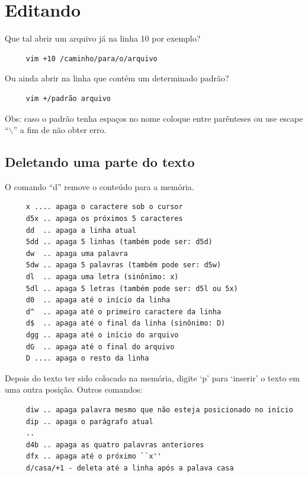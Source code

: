 \documentclass[10pt,a4paper,openany]{book}
\begin{document}
\chapter{Editando}
\label{Editando}

Que tal abrir um arquivo já na linha 10 por exemplo?

\begin{verbatim}
     vim +10 /caminho/para/o/arquivo
\end{verbatim}

Ou ainda abrir na linha que contém um determinado padrão?

\begin{verbatim}
     vim +/padrão arquivo
\end{verbatim}

Obs: caso o padrão tenha espaços no nome coloque entre parênteses ou
use escape ``$\backslash$'' a fim de não obter erro.

\section{Deletando uma parte do texto}\label{Deletando uma parte do texto}

O comando ``d'' remove o conteúdo para a memória.

\begin{verbatim}
     x .... apaga o caractere sob o cursor
     d5x .. apaga os próximos 5 caracteres
     dd  .. apaga a linha atual
     5dd .. apaga 5 linhas (também pode ser: d5d)
     dw  .. apaga uma palavra
     5dw .. apaga 5 palavras (também pode ser: d5w)
     dl  .. apaga uma letra (sinônimo: x)
     5dl .. apaga 5 letras (também pode ser: d5l ou 5x)
     d0  .. apaga até o início da linha
     d^  .. apaga até o primeiro caractere da linha
     d$  .. apaga até o final da linha (sinônimo: D)
     dgg .. apaga até o início do arquivo
     dG  .. apaga até o final do arquivo
     D .... apaga o resto da linha
\end{verbatim}

Depois do texto ter sido colocado na memória, digite `p' para `inserir' o
texto em uma outra posição. Outros comandos:

\begin{verbatim}
     diw .. apaga palavra mesmo que não esteja posicionado no início
     dip .. apaga o parágrafo atual
     ..
     d4b .. apaga as quatro palavras anteriores
     dfx .. apaga até o próximo ``x''
     d/casa/+1 - deleta até a linha após a palava casa
\end{verbatim}
\end{document}
